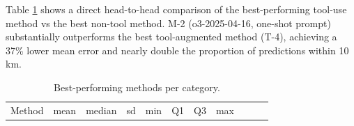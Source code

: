 Table \ref{tbl:best_methods} shows a direct head-to-head comparison of
the best-performing tool-use method vs the best non-tool method. M-2
(o3-2025-04-16, one-shot prompt) substantially outperforms the best
tool-augmented method (T-4), achieving a 37\% lower mean error and
nearly double the proportion of predictions within 10 km.

\begin{longtable}[]{@{}
  >{\raggedright\arraybackslash}p{}
  >{\raggedright\arraybackslash}p{}
  >{\raggedright\arraybackslash}p{}
  >{\raggedright\arraybackslash}p{}
  >{\raggedright\arraybackslash}p{}
  >{\raggedright\arraybackslash}p{}
  >{\raggedright\arraybackslash}p{}
  >{\raggedright\arraybackslash}p{}
  >{\raggedright\arraybackslash}p{}
  >{\raggedright\arraybackslash}p{}
  >{\raggedright\arraybackslash}p{}@{}}
\caption{\label{tbl:best_methods}Best-performing methods per
category.}\tabularnewline
\toprule\noalign{}
\begin{minipage}[b]{\linewidth}\raggedright
Method
\end{minipage} & \begin{minipage}[b]{\linewidth}\raggedright
mean
\end{minipage} & \begin{minipage}[b]{\linewidth}\raggedright
median
\end{minipage} & \begin{minipage}[b]{\linewidth}\raggedright
sd
\end{minipage} & \begin{minipage}[b]{\linewidth}\raggedright
min
\end{minipage} & \begin{minipage}[b]{\linewidth}\raggedright
Q1
\end{minipage} & \begin{minipage}[b]{\linewidth}\raggedright
Q3
\end{minipage} & \begin{minipage}[b]{\linewidth}\raggedright
max
\end{minipage} & \begin{minipage}[b]{\linewidth}\raggedright

\end{minipage}
\end{longtable}
